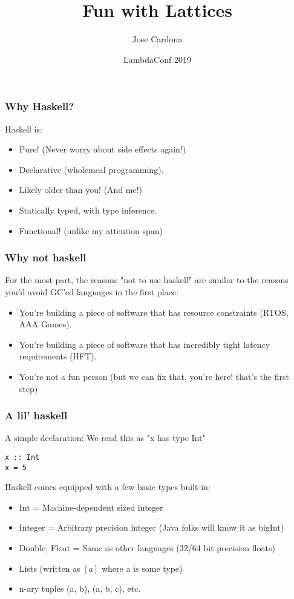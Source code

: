 \documentclass{beamer}
\title{Fun with Lattices  }
\author{Jose Cardona}
\institute{OQuant}
\date{LambdaConf 2019}
\begin{document}
 
\frame{\titlepage}

\author[Jose, Cardona] %
{}


\begin{frame}
\frametitle{Why Haskell?}

Haskell is:

\begin{itemize}
\item Pure! (Never worry about side effects again!)
\item Declarative (wholemeal programming).
\item Likely older than you! (And me!)
\item Statically typed, with type inference.
\item Functional! (unlike my attention span)
\end{itemize}

\end{frame}

\begin{frame}
\frametitle{Why not haskell}

For the most part, the reasons "not to use haskell" are similar to the reasons you'd avoid GC'ed languages in the first place:

\begin{itemize}
\item You're building a piece of software that has resource constraints (RTOS, AAA Games).
\item You're building a piece of software that has incredibly tight latency requirements (HFT).
\item You're not a fun person (but we can fix that, you're here! that's the first step)
\end{itemize}

\end{frame}

\begin{frame}[fragile]
\frametitle{A lil' haskell}

A simple declaration: We read this as "x has type Int"
\begin{center}
\begin{verbatim}
x :: Int
x = 5
\end{verbatim}
\end{center}

Haskell comes equipped with a few basic types built-in:

\begin{itemize}
\item Int = Machine-dependent sized integer
\item Integer = Arbitrary precision integer  (Java folks will know it as bigInt)
\item Double, Float = Same as other languages (32/64 bit precision floats)
\item Lists (written as $[a]$ where a is some type)
\item n-ary tuples (a, b), (a, b, c), etc.
\end{itemize}


\end{frame}
\end{document}
